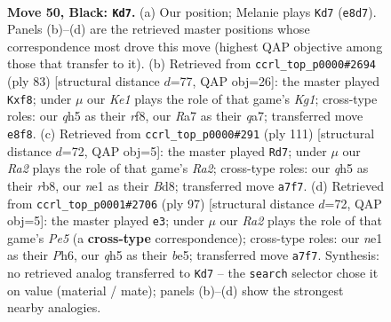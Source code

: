 \documentclass[11pt]{article}
\begin{document}
\begin{figure}[p]\centering
\begin{subfigure}{0.46\textwidth}\centering
\resizebox{\linewidth}{!}{%
\newchessgame
\chessboard[
  setfen={1qb1k3/r7/4p3/p2pPpBQ/P1n4P/3p4/2R5/RN2N1K1 b - - 2 50},
  showmover=false,
  pgfstyle=straightmove, color=movearrow, markmove={e8-d7}
]}
\caption{}
\end{subfigure}\hfill
\begin{subfigure}{0.46\textwidth}\centering
\resizebox{\linewidth}{!}{%
\newchessgame
\chessboard[
  setfen={4rRk1/Q3p3/1PNp3p/2n3pP/P7/6P1/4q1B1/6K1 b - - 0 42},
  showmover=false,
  pgfstyle=straightmove, color=movearrow, markmove={g8-f8}
]}
\caption{}
\end{subfigure}
\\[4pt]
\begin{subfigure}{0.46\textwidth}\centering
\resizebox{\linewidth}{!}{%
\newchessgame
\chessboard[
  setfen={1R1b1nk1/r5p1/q2Np2p/p1p1P3/2P4P/2B2QP1/7K/8 b - - 7 56},
  showmover=false,
  pgfstyle=straightmove, color=movearrow, markmove={a7-d7}
]}
\caption{}
\end{subfigure}\hfill
\begin{subfigure}{0.46\textwidth}\centering
\resizebox{\linewidth}{!}{%
\newchessgame
\chessboard[
  setfen={8/1b4pk/1P5p/3qB3/p1pPp1PP/Pn6/1QR2P1K/8 b - - 2 49},
  showmover=false,
  pgfstyle=straightmove, color=movearrow, markmove={e4-e3}
]}
\caption{}
\end{subfigure}
\caption{\textbf{Move 50, Black: \texttt{Kd7}.} (a) Our position; Melanie plays \texttt{Kd7} (\texttt{e8d7}). Panels (b)--(d) are the retrieved master positions whose correspondence most drove this move (highest QAP objective among those that transfer to it). (b) Retrieved from \texttt{ccrl\_top\_p0000\#2694} (ply 83) [structural distance $d$=77, QAP obj=26]: the master played \texttt{Kxf8}; under $\mu$ our \emph{Ke1} plays the role of that game's \emph{Kg1}; cross-type roles: our \emph{q}h5 as their \emph{r}f8, our \emph{R}a7 as their \emph{q}a7; transferred move \texttt{e8f8}. (c) Retrieved from \texttt{ccrl\_top\_p0000\#291} (ply 111) [structural distance $d$=72, QAP obj=5]: the master played \texttt{Rd7}; under $\mu$ our \emph{Ra2} plays the role of that game's \emph{Ra2}; cross-type roles: our \emph{q}h5 as their \emph{r}b8, our \emph{n}e1 as their \emph{B}d8; transferred move \texttt{a7f7}. (d) Retrieved from \texttt{ccrl\_top\_p0001\#2706} (ply 97) [structural distance $d$=72, QAP obj=5]: the master played \texttt{e3}; under $\mu$ our \emph{Ra2} plays the role of that game's \emph{Pe5} (a \textbf{cross-type} correspondence); cross-type roles: our \emph{n}e1 as their \emph{P}h6, our \emph{q}h5 as their \emph{b}e5; transferred move \texttt{a7f7}. Synthesis: no retrieved analog transferred to \texttt{Kd7} -- the \texttt{search} selector chose it on value (material / mate); panels (b)--(d) show the strongest nearby analogies.}
\label{fig:thought-m99}
\end{figure}
\end{document}
